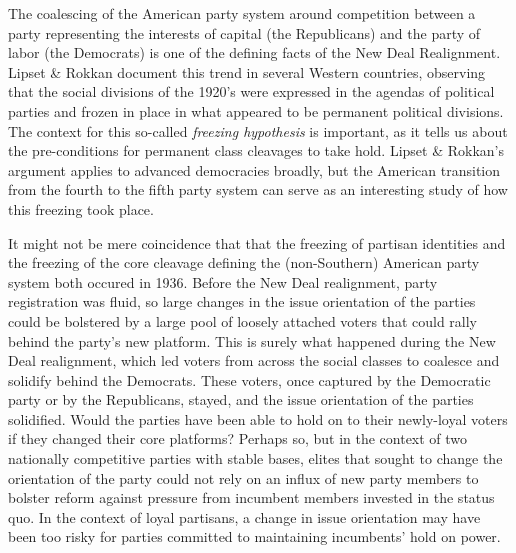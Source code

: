\documentclass[11pt]{scrartcl}\usepackage[]{graphicx}\usepackage[]{color}
\begin{document}
The coalescing of the American party system around competition between a party representing the interests of capital (the Republicans) and the party of labor (the Democrats) is one of the defining facts of the New Deal Realignment. Lipset \& Rokkan \citeyearpar{lipset1967cleavage} document this trend in several Western countries, observing that the social divisions of the 1920's were expressed in the agendas of political parties and frozen in place in what appeared to be permanent political divisions. The context for this so-called \textit{freezing hypothesis} is important, as it tells us about the pre-conditions for permanent class cleavages to take hold.  Lipset \& Rokkan's argument applies to advanced democracies broadly, but the American transition from the fourth to the fifth party system can serve as an interesting study of how this freezing took place.

It might not be mere coincidence that that the freezing of partisan identities  and the freezing of the core cleavage defining the (non-Southern) American party system both occured in 1936.  Before the New Deal realignment, party registration was fluid, so large changes in the issue orientation of the parties could be bolstered by a large pool of loosely attached voters that could rally behind the party's new platform.  This is surely what happened during the New Deal realignment, which led voters from across the social classes to coalesce and solidify behind the Democrats. These voters, once captured by the Democratic party or by the Republicans, stayed, and the issue orientation of the parties solidified.  Would the parties have been able to hold on to their newly-loyal voters if they changed their core platforms? Perhaps so, but in the context of two nationally competitive parties with stable bases, elites that sought to change the orientation of the party could not rely on an influx of new party members to bolster reform against pressure from incumbent members invested in the status quo. In the context of loyal partisans, a change in issue orientation may have been too risky for parties committed to maintaining incumbents' hold on power.
\end{document}
